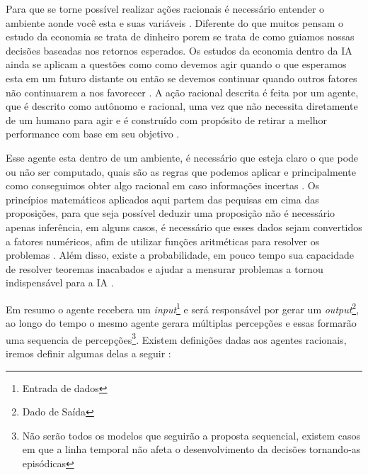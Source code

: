 \documentclass[
	12pt,				%
	openright,			%
	twoside,			%
	a4paper,			%
	english,			%
	french,				%
	spanish,			%
	brazil				%
	]{abntex2}
\begin{document}
Para que se torne possível realizar ações racionais é necessário entender o ambiente aonde você esta e suas variáveis \cite[99]{simon1955behavioral}. Diferente do que muitos pensam o estudo da economia se trata de dinheiro porem se trata de como guiamos nossas decisões baseadas nos retornos esperados. Os estudos da economia dentro da IA ainda se aplicam a questões como como devemos agir quando o que esperamos esta em um futuro distante ou então se devemos continuar quando outros fatores não continuarem a nos favorecer \cite[9]{russell2003artificial}. A ação racional descrita é feita por um agente, que é descrito como autônomo e racional, uma vez que não necessita diretamente de um humano para agir e é construído com propósito de retirar a melhor performance com base em seu objetivo \cite[2]{ wooldridge1994agent}.

Esse agente esta dentro de um ambiente, é necessário que esteja claro o que pode ou não ser computado, quais são as regras que podemos aplicar e principalmente como conseguimos obter algo racional em caso informações incertas \cite[7]{russell2003artificial}. Os princípios matemáticos aplicados aqui partem das pequisas em cima das proposições, para que seja possível deduzir uma proposição não é necessário apenas inferência, em alguns casos, é necessário que esses dados sejam convertidos a fatores numéricos, afim de utilizar funções aritméticas para resolver os problemas \cite[2-4]{boole1854investigation}. Além disso, existe a probabilidade, em pouco tempo sua capacidade de resolver teoremas inacabados e ajudar a mensurar problemas a tornou indispensável para a IA \cite[9]{russell2003artificial}.
 
Em resumo o agente recebera um \textit{input}\footnote{Entrada de dados} e será responsável por gerar um \textit{output}\footnote{Dado de Saída}, ao longo do tempo o mesmo agente gerara múltiplas percepções e essas formarão uma sequencia de percepções\footnote{Não serão todos os modelos que seguirão a proposta sequencial, existem casos em que a linha temporal não afeta o desenvolvimento da decisões tornando-as episódicas}. \cite[34-35]{russell2003artificial} Existem definições dadas aos agentes racionais, iremos definir algumas delas a seguir \cite[42-45]{russell2003artificial}:
\end{document}
